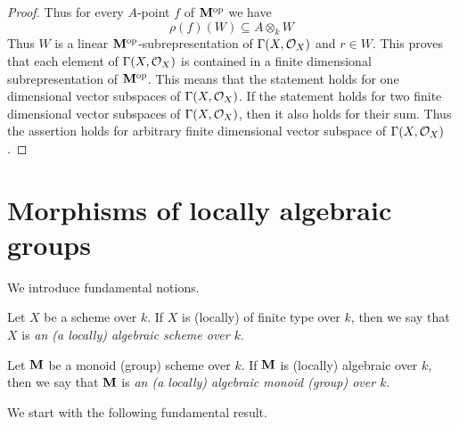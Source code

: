 \begin{proof}
Thus for every $A$-point $f$ of $\mathbf{M}^{\mathrm{op}}$ we have
$$\rho(f)\left(W\right) \subseteq A\otimes_kW$$
Thus $W$ is a linear $\mathbf{M}^{\mathrm{op}}$-subrepresentation of $\Gamma(X,{\mathcal O}_X)$ and $r\in W$. This proves that each element of $\Gamma(X,{\mathcal O}_X)$ is contained in a finite dimensional subrepresentation of $\mathbf{M}^{\mathrm{op}}$. This means that the statement holds for one dimensional vector subspaces of $\Gamma(X,{\mathcal O}_X)$. If the statement holds for two finite dimensional vector subspaces of $\Gamma(X,{\mathcal O}_X)$, then it also holds for their sum. Thus the assertion holds for arbitrary finite dimensional vector subspace of $\Gamma(X,{\mathcal O}_X)$.
\end{proof}

\section{Morphisms of locally algebraic groups}
\noindent
We introduce fundamental notions.

\begin{definition}
Let $X$ be a scheme over $k$. If $X$ is (locally) of finite type over $k$, then we say that $X$ is \textit{an (a locally) algebraic scheme over $k$}.
\end{definition}

\begin{definition}
Let $\mathbf{M}$ be a monoid (group) scheme over $k$. If $\mathbf{M}$ is (locally) algebraic over $k$, then we say that $\mathbf{M}$ is \textit{an (a locally) algebraic monoid (group) over $k$}.
\end{definition}
We start with the following fundamental result.

